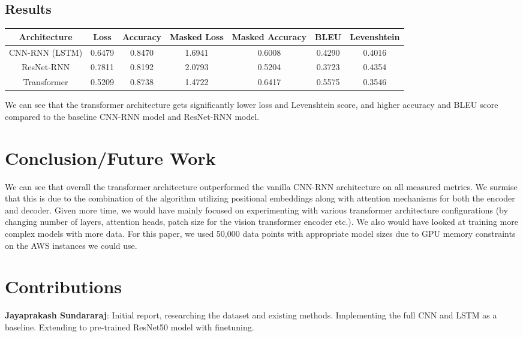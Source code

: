 \documentclass{article}
\begin{document}
\subsection{Results}
\begin{center}
\begin{tabular}{||c | c | c | c | c | c | c ||} 
 \hline
 Architecture & Loss & Accuracy & Masked Loss & Masked Accuracy & BLEU & Levenshtein \\ [0.5ex] 
 \hline\hline
 CNN-RNN (LSTM) & 0.6479 & 0.8470 & 1.6941 & 0.6008 & 0.4290 &  0.4016 \\ 
 \hline
ResNet-RNN  & 0.7811  & 0.8192 & 2.0793  & 0.5204 & 0.3723  &  0.4354\\ 
 \hline
Transformer  & 0.5209 & 0.8738 & 1.4722 & 0.6417 & 0.5575 & 0.3546\\
 \hline
\end{tabular}
\end{center}

We can see that the transformer architecture gets significantly lower loss and Levenshtein score, and higher accuracy and BLEU score compared to the baseline CNN-RNN model and ResNet-RNN model.

\section{Conclusion/Future Work}
We can see that overall the transformer architecture outperformed the vanilla CNN-RNN architecture on all measured metrics. We surmise that this is due to the combination of the algorithm utilizing positional embeddings along with attention mechanisms for both the encoder and decoder. Given more time, we would have mainly focused on experimenting with various transformer architecture configurations (by changing number of layers, attention heads, patch size for the vision transformer encoder etc.). We also would have looked at training more complex models with more data. For this paper, we used 50,000 data points with appropriate model sizes due to GPU memory constraints on the AWS instances we could use.

\section{Contributions}

\textbf{Jayaprakash Sundararaj}: Initial report, researching the dataset and existing methods. Implementing the full CNN and LSTM as a baseline. Extending to pre-trained ResNet50 model with finetuning.
\end{document}
